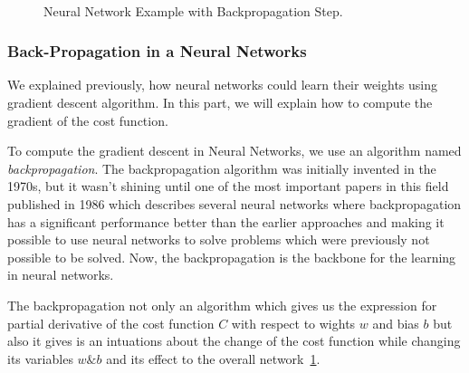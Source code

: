    \begin{figure}[t]
     
  \caption{Neural Network Example with Backpropagation Step.}~\label{Fig:NN_With_BP}
\end{figure}%

\subsubsection{Back-Propagation in a Neural Networks}

We explained previously,  how neural networks could learn their weights using gradient descent algorithm. In this part, we will explain how to compute the gradient of the cost function.

To compute the gradient descent in Neural Networks, we use an algorithm named \textit{backpropagation}. The backpropagation algorithm was initially invented in the 1970s, but it wasn't shining until one of the most important papers in this field published in 1986 %
which describes several neural networks where backpropagation has a significant performance better than the earlier approaches and making it possible to use neural networks to solve problems which were previously not possible to be solved. Now, the backpropagation is the backbone for the learning in neural networks.%

The backpropagation not only an algorithm which gives us the expression for partial derivative of the cost function $C$ with respect to wights $w$ and bias $b$ but also it gives is an intuations about the change of the cost function while changing its variables $w \& b$ and its effect to the overall network~\ref{Fig:NN_With_BP}.


